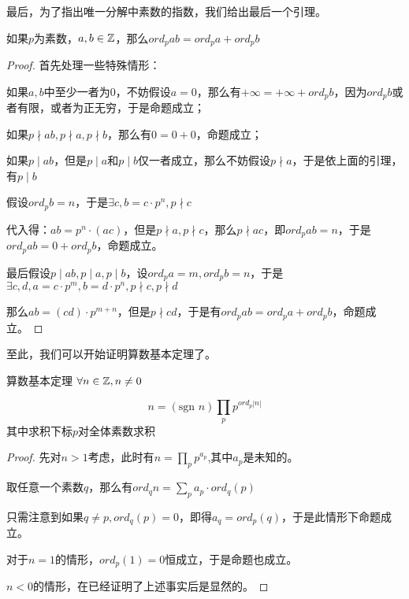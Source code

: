 \documentclass[12pt, a4paper, oneside, UTF8]{ctexbook}
\begin{document}
			最后，为了指出唯一分解中素数的指数，我们给出最后一个引理。
			\begin{lemma}{}{}
				如果$p$为素数，$a,b\in \mathbb{Z}$，那么$ord_p ab=ord_p a + ord_p b$
			\end{lemma}
			\begin{proof}
				首先处理一些特殊情形：
				
				如果$a,b$中至少一者为$0$，不妨假设$a=0$，那么有$+\infty = +\infty + ord_p b$，因为$ord_p b$或者有限，或者为正无穷，于是命题成立；
				
				如果$p \nmid ab,p\nmid a,p\nmid b$，那么有$0=0+0$，命题成立；
				
				如果$p \mid ab$，但是$p \mid a$和$p \mid b$仅一者成立，那么不妨假设$p \nmid a$，于是依上面的引理，有$p \mid b$
				
				假设$ord_p b = n$，于是$\exists c,b=c\cdot p^n,p \nmid c$
				
				代入得：$ab=p^n\cdot (ac)$，但是$p \nmid a,p\nmid c$，那么$p \nmid ac$，即$ord_p ab=n$，于是$ord_p ab = 0+ ord_p b$，命题成立。
				
				最后假设$p \mid ab,p \mid a,p \mid b$，设$ord_p a = m,ord_p b = n$，于是$\exists c,d,a = c\cdot p^m,b=d\cdot p^n,p \nmid c,p\nmid d$
				
				那么$ab=(cd)\cdot p^{m+n}$，但是$p \nmid cd$，于是有$ord_p ab=ord_p a + ord_p b$，命题成立。
			\end{proof}
			至此，我们可以开始证明算数基本定理了。
			\begin{them}{算数基本定理}{}
				$\forall n \in \mathbb{Z},n \neq 0$
				
				\begin{equation}
					n = (\text{sgn } n) \prod_{p} p^{ord_p |n|}
				\end{equation}
				其中求积下标$p$对全体素数求积
			\end{them}
			\begin{proof}
				先对$n > 1$考虑，此时有$n=\prod_{p} p^{a_p}$,其中$a_p$是未知的。
				
				取任意一个素数$q$，那么有$ord_q n=\sum\limits_{p} a_p\cdot ord_q (p)$
				
				只需注意到如果$q \neq p,ord_q (p)=0$，即得$a_q = ord_p (q)$，于是此情形下命题成立。
				
				对于$n=1$的情形，$ord_p (1)=0$恒成立，于是命题也成立。
				
				$n <0$的情形，在已经证明了上述事实后是显然的。 
			\end{proof}
\ifx\allfiles\undefined
\end{document}
